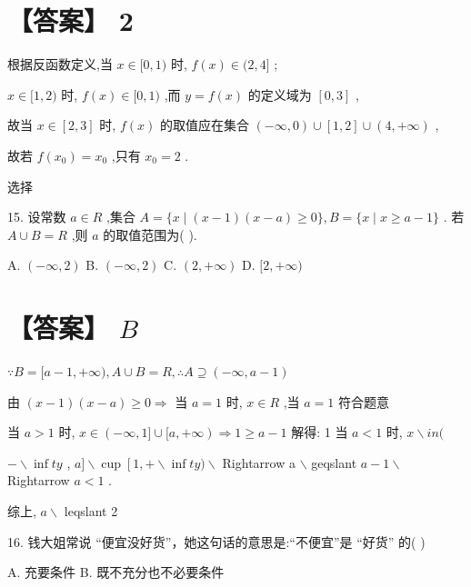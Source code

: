 \documentclass[10pt]{article}
\begin{document}
\section*{【答案】 2}

根据反函数定义,当 \(x \in  \lbrack 0,1)\) 时, \(f\left( x\right)  \in  (2,4\rbrack\) ;

\(x \in  \lbrack 1,2)\) 时, \(f\left( x\right)  \in  \lbrack 0,1)\) ,而 \(y = f\left( x\right)\) 的定义域为 \(\left\lbrack  {0,3}\right\rbrack\) ,

故当 \(x \in  \left\lbrack  {2,3}\right\rbrack\) 时, \(f\left( x\right)\) 的取值应在集合 \(\left( {-\infty ,0}\right)  \cup  \left\lbrack  {1,2}\right\rbrack   \cup  \left( {4, + \infty }\right)\) ,

故若 \(f\left( {x}_{0}\right)  = {x}_{0}\) ,只有 \({x}_{0} = 2\) .

选择

15. 设常数 \(a \in  R\) ,集合 \(A = \{ x \mid  \left( {x - 1}\right) \left( {x - a}\right)  \geq  0\} ,B = \{ x \mid  x \geq  a - 1\}\) . 若 \(A \cup  B = R\) ,则 \(a\) 的取值范围为( ).

A. \(\left( {-\infty ,2}\right)\) B. \(\left( {-\infty ,2}\right)\) C. \(\left( {2, + \infty }\right)\) D. \(\lbrack 2, + \infty )\)

\section*{【答案】 \(B\)}

\(\because B = \lbrack a - 1, + \infty ),A \cup  B = R,\therefore A \supseteq  \left( {-\infty ,a - 1}\right)\)

由 \(\left( {x - 1}\right) \left( {x - a}\right)  \geq  0 \Rightarrow\) 当 \(a = 1\) 时, \(x \in  R\) ,当 \(a = 1\) 符合题意

当 \(a > 1\) 时, \(x \in  ( - \infty ,1\rbrack  \cup  \lbrack a, + \infty ) \Rightarrow  1 \geq  a - 1\) 解得: 1 当 \(a < 1\) 时, \(x \smallsetminus  {in}(\)

\(-  \smallsetminus  \inf {ty}\) , \(a\rbrack  \smallsetminus  \operatorname{cup}\left\lbrack  {1, +  \smallsetminus  \inf {ty}}\right. ) \smallsetminus\) Rightarrow a \(\smallsetminus\) geqslant \(a - 1 \smallsetminus\) Rightarrow \(a < 1\) .

综上, \(a \smallsetminus\) leqslant 2

16. 钱大姐常说 “便宜没好货”，她这句话的意思是:“不便宜”是 “好货” 的( )

A. 充要条件 B. 既不充分也不必要条件
\end{document}
